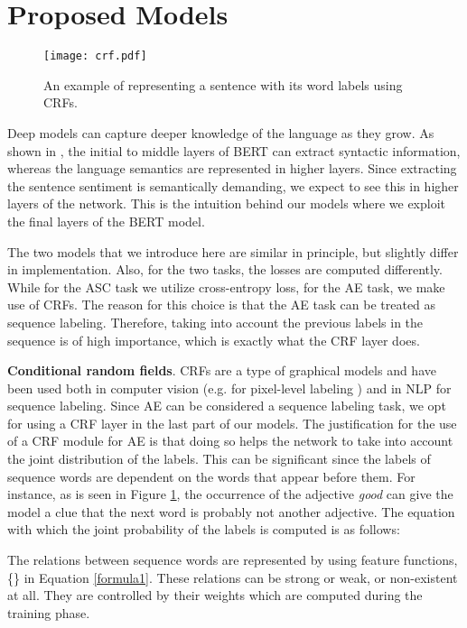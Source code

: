 \documentclass{article}
\begin{document}
\section{Proposed Models}
\begin{figure}
	\centering
	\texttt{[image: crf.pdf]}
	\caption{An example of representing a sentence with its word labels using CRFs.}
	\label{crf}
\end{figure}

Deep models can capture deeper knowledge of the language as they grow. As shown in \cite{jawahar2019does}, the initial to middle layers of BERT can extract syntactic information, whereas the language semantics are represented in higher layers. Since extracting the sentence sentiment is semantically demanding, we expect to see this in higher layers of the network. This is the intuition behind our models where we exploit the final layers of the BERT model. 

The two models that we introduce here are similar in principle, but slightly differ in implementation. Also, for the two tasks, the losses are computed differently. While for the ASC task we utilize cross-entropy loss, for the AE task, we make use of CRFs. The reason for this choice is that the AE task can be treated as sequence labeling. Therefore, taking into account the previous labels in the sequence is of high importance, which is exactly what the CRF layer does. 	

\textbf{Conditional random fields}. CRFs \cite{lafferty2001conditional} are a type of graphical models and have been used both in computer vision (e.g. for pixel-level labeling \cite{zheng2015conditional}) and in NLP for sequence labeling. Since AE can be considered a sequence labeling task, we opt for using a CRF layer in the last part of our models. The justification for the use of a CRF module for AE is that doing so helps the network to take into account the joint distribution of the labels. This can be significant since the labels of sequence words are dependent on the words that appear before them. For instance, as is seen in Figure \ref{crf}, the occurrence of the adjective \textit{good} can give the model a clue that the next word is probably not another adjective. The equation with which the joint probability of the labels is computed is as follows:


The relations between sequence words are represented by using feature functions, \{\} in Equation \ref{formula1}. These relations can be strong or weak, or non-existent at all. They are controlled by their weights  which are computed during the training phase. 
\end{document}
